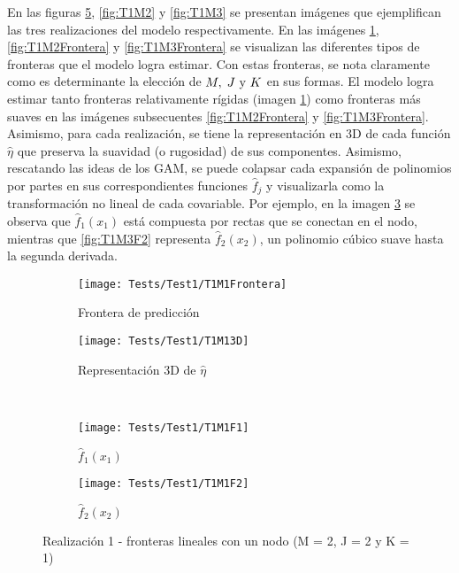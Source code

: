 \documentclass[../Main/Main.tex]{subfiles}
\begin{document}
En las figuras \ref{fig:T1M1}, \ref{fig:T1M2} y \ref{fig:T1M3} se presentan imágenes que ejemplifican las tres realizaciones del modelo respectivamente. En las imágenes \ref{fig:T1M1Frontera}, \ref{fig:T1M2Frontera} y \ref{fig:T1M3Frontera} se visualizan las diferentes tipos de fronteras que el modelo logra estimar. Con estas fronteras, se nota claramente como es determinante la elección de $M,\;J\text{ y }K$ en sus formas. El modelo logra estimar tanto fronteras relativamente rígidas (imagen \ref{fig:T1M1Frontera}) como fronteras más suaves en las imágenes subsecuentes \ref{fig:T1M2Frontera} y \ref{fig:T1M3Frontera}. Asimismo, para cada realización, se tiene la representación en 3D de cada función $\hat{\eta}$ que preserva la suavidad (o rugosidad) de sus componentes. Asimismo, rescatando las ideas de los GAM, se puede colapsar cada expansión de polinomios por partes en sus correspondientes funciones $\hat{f}_j$ y visualizarla como la transformación no lineal de cada covariable. Por ejemplo, en la imagen \ref{fig:T1M1F1} se observa que $\hat{f}_1(x_1)$ está compuesta por rectas que se conectan en el nodo, mientras que \ref{fig:T1M3F2} representa $\hat{f}_2(x_2)$, un polinomio cúbico suave hasta la segunda derivada.  

\begin{figure}[p]
	\centering
	\begin{subfigure}[b]{0.45\textwidth}
    	\texttt{[image: Tests/Test1/T1M1Frontera]}
		\caption{Frontera de predicción}
		\label{fig:T1M1Frontera}
	\end{subfigure}
	\hfill    
    \begin{subfigure}[b]{0.45\textwidth}
        \texttt{[image: Tests/Test1/T1M13D]}
        \caption{Representación 3D de $\hat{\eta}$}
        \label{fig:T1M13D}
    \end{subfigure}
    \\[3pt]
    \begin{subfigure}[b]{0.45\textwidth}
    	\texttt{[image: Tests/Test1/T1M1F1]}
		\caption{$\hat{f}_1(x_1)$}
		\label{fig:T1M1F1}
	\end{subfigure}
	\hfill    
    \begin{subfigure}[b]{0.45\textwidth}
        \texttt{[image: Tests/Test1/T1M1F2]}
        \caption{$\hat{f}_2(x_2)$}
        \label{fig:T1M1F2}
    \end{subfigure}
    \caption{Realización 1 - fronteras lineales con un nodo (M = 2, J = 2 y K = 1)}
    \label{fig:T1M1}
\end{figure}
\end{document}
